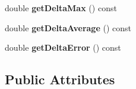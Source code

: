 \begin{DoxyCompactItemize}
\item 
\hypertarget{class_date_dialog_adfbd25114d618b0765adba91a9039188}{double {\bfseries get\-Delta\-Max} () const }\label{class_date_dialog_adfbd25114d618b0765adba91a9039188}

\item 
\hypertarget{class_date_dialog_a29f4febd09d92a52e79d4a2432900f04}{double {\bfseries get\-Delta\-Average} () const }\label{class_date_dialog_a29f4febd09d92a52e79d4a2432900f04}

\item 
\hypertarget{class_date_dialog_af8e19c4901c537b42f8a1add72c75b1c}{double {\bfseries get\-Delta\-Error} () const }\label{class_date_dialog_af8e19c4901c537b42f8a1add72c75b1c}

\end{DoxyCompactItemize}
\subsection*{Public Attributes}
